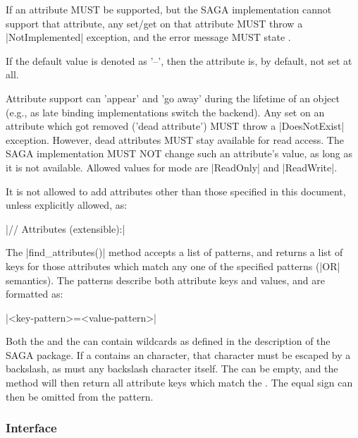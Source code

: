     If an attribute MUST be supported, but the SAGA
    implementation cannot support that attribute, any set/get on
    that attribute MUST throw a |NotImplemented| exception, and
    the error message MUST state .
 
    If the default value is denoted as '--', then the
    attribute is, by default, not set at all.
 
    Attribute support can 'appear' and 'go away' during the
    lifetime of an object (e.g., as late binding implementations
    switch the backend).  Any set on an attribute which
    got removed ('dead attribute') MUST throw a |DoesNotExist|
    exception.  However, dead attributes MUST stay available for
    read access.  The SAGA implementation MUST NOT change such an
    attribute's value, as long as it is not available.  Allowed
    values for mode are |ReadOnly| and |ReadWrite|.
 
    It is not allowed to add attributes other than
    those specified in this document, unless explicitly
    allowed, as:
 
    \shift |//  Attributes (extensible):|
 
    The |find_attributes()| method accepts a list of
    patterns, and returns a list of keys for those attributes
    which match any one of the specified patterns (|OR|
    semantics).  The patterns  describe both
    attribute keys and values, and are formatted as:
    
    \shift |<key-pattern>=<value-pattern>|
 
    Both the  and the  can
    contain wildcards as defined in the description of
    the SAGA  package.  If a
     contains an  character, that character
    must be escaped by a backslash, as must any backslash
    character itself.  The  can be empty, and the method
    will then return all attribute keys which match the
    .  The equal sign  can then be omitted
    from the pattern.
 
 
 \subsubsection*{Interface }
 
